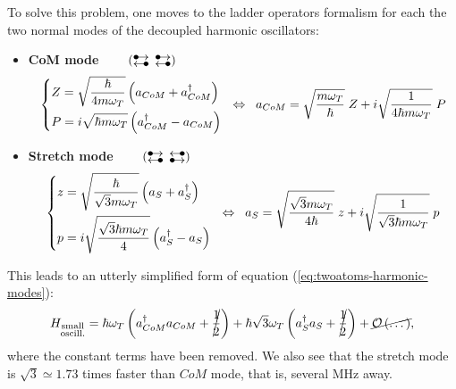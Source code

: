 \noindent To solve this problem, one moves to the ladder operators formalism for each the two normal modes of the decoupled harmonic oscillators:
\begin{itemize}

    \item \textbf{CoM mode}
    $\qquad \left( \substack{
        \hbox{$\bullet$}\kern-2pt\hbox{$\rightarrow$} \; \; \hbox{$\bullet$}\kern-2pt\hbox{$\rightarrow$} \\ 
        \hbox{$\leftarrow$}\kern-2pt\hbox{$\bullet$}  \; \; \hbox{$\leftarrow$}\kern-2pt\hbox{$\bullet$} } \right)$
    \begin{align*}
    \begin{dcases}
        Z = \sqrt{\frac{\hbar}{4m\omega_T}}
            \left(  a_{CoM} + a_{CoM}^\dag \right)\\
        P = i\sqrt{\hbar m\omega_T}
            \left(  a_{CoM}^\dag - a_{CoM} \right)
    \end{dcases}
    \;\;\Leftrightarrow\;\; a_{CoM} = \sqrt{\frac{m\omega_T}{\hbar}}\;Z+
            i\sqrt{\frac{1}{4\hbar m\omega_T}}\;P
    \end{align*}

    \item \textbf{Stretch mode}
    $\qquad \left( \substack{ 
        \hbox{$\bullet$}\kern-2pt\hbox{$\rightarrow$} \; \; \hbox{$\leftarrow$}\kern-2pt\hbox{$\bullet$} \\
        \hbox{$\leftarrow$}\kern-2pt\hbox{$\bullet$}  \; \; \hbox{$\bullet$}\kern-2pt\hbox{$\rightarrow$} } \right)$
    \begin{align*}
    \begin{dcases}
        z = \sqrt{\frac{\hbar}{\sqrt{3}m\omega_T}}
            \left(  a_{S} + a_{S}^\dag \right)\\
        p = i\sqrt{\frac{\sqrt{3}\hbar m\omega_T}{4}}
            \left(  a_{S}^\dag - a_{S} \right)
    \end{dcases}
    \;\;\Leftrightarrow \;\;
    a_{S} = \sqrt{\frac{\sqrt{3}m\omega_T}{4\hbar}}\;z+
            i\sqrt{\frac{1}{\sqrt{3}\hbar m\omega_T}}\;p
    \end{align*}
\end{itemize}
This leads to an utterly simplified form of equation (\ref{eq:twoatoms-harmonic-modes}):
\begin{align}
\label{eq:twoatoms-ladder-harmonic-modes}
H_{\substack{\text{small} \\ \text{oscill.}}} = \hbar\omega_T
    \left( a_{CoM}^\dag a_{CoM} + \cancel{\frac{1}{2}} \right) +
    \hbar\sqrt{3}\omega_T
    \left( a_{S}^\dag a_{S} + \cancel{\frac{1}{2}} \right)
    + \cancel{\mathcal{O}\left( \dots \right)},
\end{align}
where the constant terms have been removed. We also see that the stretch mode is $\sqrt{3} \simeq 1.73$ times faster than $CoM$ mode, that is, several MHz away.

